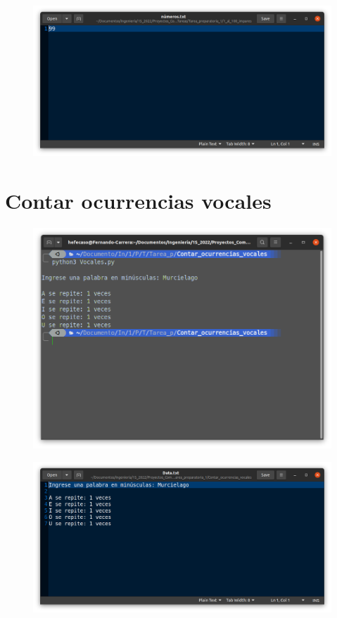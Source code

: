 \documentclass[12pt,letterpaper]{article}
\begin{document}
\begin{multicols}{2}
\begin{figure}[H]
\centering
\includegraphics[width = \columnwidth]{1-txt-2_1_al_100.png}
\end{figure}

\section{Contar ocurrencias vocales}

\begin{figure}[H]
\centering
\includegraphics[width = \columnwidth]{2-py_ocurrencia_vocales.png}
\end{figure}


\begin{figure}[H]
\centering
\includegraphics[width = \columnwidth]{2-txt_ocurrencia_vocales.png}
\end{figure}



\end{multicols}
\end{document}
